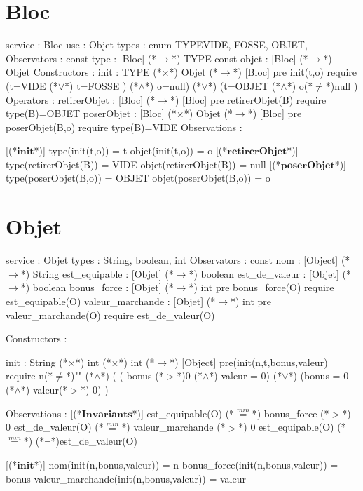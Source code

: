 \documentclass[a4paper, 11pt]{report}
\newcommand{\specB}[1]{\textbf{#1}}
\begin{document}
\section{Bloc}
\begin{Spe}
service : Bloc
use : Objet
types : enum TYPE{VIDE, FOSSE, OBJET},
Observators :
      const type : [Bloc] (*$\rightarrow$*) TYPE
      const objet : [Bloc] (*$\rightarrow$*) Objet
Constructors :
      init : TYPE (*$\times$*) Objet (*$\rightarrow$*) [Bloc]
            pre init(t,o) require 
            (t=VIDE (*$\lor$*) t=FOSSE ) (*$\land$*) o=null) (*$\lor$*) (t=OBJET (*$\land$*) o(*$\ne$*)null ) 
Operators :
      retirerObjet : [Bloc] (*$\rightarrow$*) [Bloc]
            pre retirerObjet(B) require type(B)=OBJET 
      poserObjet : [Bloc] (*$\times$*) Objet (*$\rightarrow$*) [Bloc]
            pre poserObjet(B,o) require type(B)=VIDE 
Observations :
     
      [(*$\specB{init}$*)]
            type(init(t,o)) = t
            objet(init(t,o)) = o
      [(*$\specB{retirerObjet}$*)]
            type(retirerObjet(B)) = VIDE
            objet(retirerObjet(B)) = null
      [(*$\specB{poserObjet}$*)] 
            type(poserObjet(B,o)) = OBJET
            objet(poserObjet(B,o)) = o 
     
\end{Spe}
 
\section{Objet}
\begin{Spe}


service : Objet 
types : String, boolean, int
Observators :
	const nom : [Object] (*$\rightarrow$*) String
	est_equipable : [Objet] (*$\rightarrow$*) boolean 
	est_de_valeur : [Objet] (*$\rightarrow$*) boolean
	bonus_force : [Objet] (*$\rightarrow$*) int
		pre bonus_force(O) require est_equipable(O) 
	valeur_marchande : [Objet] (*$\rightarrow$*) int
		pre valeur_marchande(O) require est_de_valeur(O)

Constructors :

	init : String (*$\times$*) int (*$\times$*) int (*$\rightarrow$*) [Object] 
		pre(init(n,t,bonus,valeur) require n(*$\ne$*)"" (*$\land$*) ( ( bonus (*$>$*)0 (*$\land$*) valeur = 0) (*$\lor$*) (bonus = 0 (*$\land$*) valeur(*$>$*) 0) ) 
                
Observations : 
	 [(*$\specB{Invariants}$*)]
	        est_equipable(O) (*$\stackrel{min}{=}$*) bonus_force (*$>$*) 0
	        est_de_valeur(O) (*$\stackrel{min}{=}$*) valeur_marchande (*$>$*) 0
	        est_equipable(O) (*$\stackrel{min}{=}$*) (*$\lnot$*)est_de_valeur(O)
	        
	 [(*$\specB{init}$*)]
		nom(init(n,bonus,valeur)) = n 
		bonus_force(init(n,bonus,valeur)) = bonus 
		valeur_marchande(init(n,bonus,valeur)) = valeur 

\end{Spe}
\end{document}

